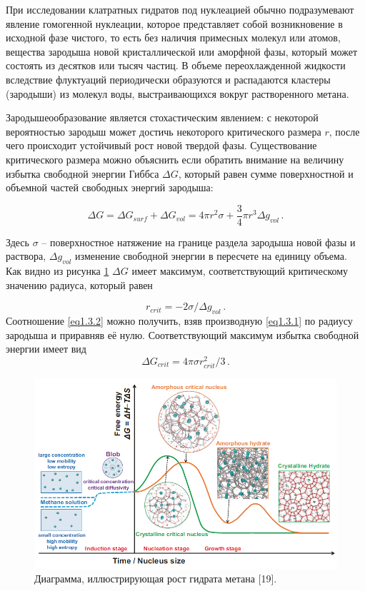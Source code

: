 \par При исследовании клатратных гидратов под нуклеацией обычно подразумевают явление гомогенной нуклеации, которое представляет собой возникновение в исходной фазе чистого, то есть без наличия примесных молекул или атомов, вещества зародыша новой кристаллической или аморфной фазы, который может состоять из десятков или тысяч частиц. В объеме переохлажденной жидкости вследствие флуктуаций периодически образуются и распадаются кластеры (зародыши) из молекул воды, выстраивающихся вокруг растворенного метана.

\par Зародышеообразование является стохастическим явлением: с некоторой вероятностью зародыш может достичь некоторого критического размера $r$, после чего происходит устойчивый рост новой твердой фазы. Существование критического размера можно объяснить если обратить внимание на величину избытка свободной энергии Гиббса $\Delta G$, который равен сумме поверхностной и объемной частей свободных энергий зародыша:

\begin{equation}
\Delta G = \Delta G_{surf} + \Delta G_{vol} = 4\pi r^2 \sigma + \frac{3}{4}\pi r^3 \Delta g_{vol} \, .
\label{eq1.3.1}
\end{equation}

Здесь $\sigma$ -- поверхностное натяжение на границе раздела зародыша новой фазы и раствора, $\Delta g_{vol}$ изменение свободной энергии в пересчете на единицу объема. Как видно из рисунка \ref{fig1.3.1} $\Delta G$ имеет максимум, соответствующий критическому значению радиуса, который равен

\begin{equation}
    r_{crit} = -2\sigma/\Delta g_{vol} \,.
    \label{eq1.3.2}
\end{equation}
Соотношение \ref{eq1.3.2} можно получить, взяв производную \ref{eq1.3.1} по радиусу зародыша и приравняв её нулю. Соответствующий максимум избытка свободной энергии имеет вид
\begin{equation}
    \Delta G_{crit} = 4\pi\sigma r_{crit}^2 / 3 \,.
    \label{eq1.3.3}
\end{equation}

\begin{figure}[H] 
    \centering
    \includegraphics[width=.9\linewidth]{figures/hydrnucl.png}
    \caption{Диаграмма, иллюстрирующая рост гидрата метана [19].}
    \label{fig1.3.1}
\end{figure}

